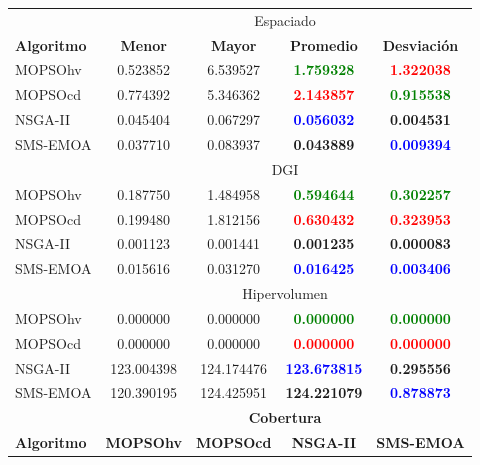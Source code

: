 \begin{table}
 \begin{center}
  \begin{tabular}{|l|cc|cc|} \hline
    & \multicolumn{4}{|c|}{Espaciado} \\ 
	\textbf{Algoritmo} & \textbf{Menor} & \textbf{Mayor} & \textbf{Promedio} & \textbf{Desviaci\'on} \\  \hline \hline
	MOPSOhv &0.523852 & 6.539527 & \textbf{\textcolor{green}{ 1.759328}} &  \textbf{\textcolor{red}{1.322038}}    \\ 
	MOPSOcd &0.774392 & 5.346362 & \textbf{\textcolor{red}{ 2.143857}} &  \textbf{\textcolor{green}{0.915538}}   \\ 
	NSGA-II &0.045404 & 0.067297 & \textbf{\textcolor{blue}{ 0.056032}} &  \textbf{0.004531}   \\  
	SMS-EMOA &0.037710 & 0.083937 & \textbf{0.043889} & \textbf{\textcolor{blue}{ 0.009394 }} \\  
	\hline\hline
    & \multicolumn{4}{|c|}{DGI} \\ 
	\hline\hline
	MOPSOhv &0.187750 & 1.484958 & \textbf{\textcolor{green}{ 0.594644}} &  \textbf{\textcolor{green}{0.302257}}   \\ 
	MOPSOcd &0.199480 & 1.812156 & \textbf{\textcolor{red}{ 0.630432}} & \textbf{\textcolor{red}{ 0.323953}}  \\ 
	NSGA-II &0.001123 & 0.001441 & \textbf{0.001235} &  \textbf{0.000083} \\  
	SMS-EMOA &0.015616 & 0.031270 & \textbf{\textcolor{blue}{ 0.016425}} &  \textbf{\textcolor{blue}{0.003406}}  \\  
	\hline\hline
    & \multicolumn{4}{|c|}{Hipervolumen} \\ 
	\hline\hline
	MOPSOhv &0.000000 & 0.000000 & \textbf{\textcolor{green}{ 0.000000 }}& \textbf{\textcolor{green}{ 0.000000 }}\\ 
	MOPSOcd &0.000000 & 0.000000 &  \textbf{\textcolor{red}{0.000000}} & \textbf{\textcolor{red}{ 0.000000 }} \\ 
	NSGA-II &123.004398 & 124.174476 &  \textbf{\textcolor{blue}{123.673815}} &  \textbf{0.295556} \\  
	SMS-EMOA &120.390195 & 124.425951 & \textbf{124.221079} & \textbf{\textcolor{blue}{ 0.878873}}  \\  
	\hline\hline
	& \multicolumn{4}{|c|}{\textbf{Cobertura}} \\ \hline\hline 
	\textbf{Algoritmo} & \textbf{MOPSOhv} & \textbf{MOPSOcd} & \textbf{NSGA-II} & \textbf{SMS-EMOA} \\  \hline \hline

\end{tabular}
\end{center}
\end{table}
